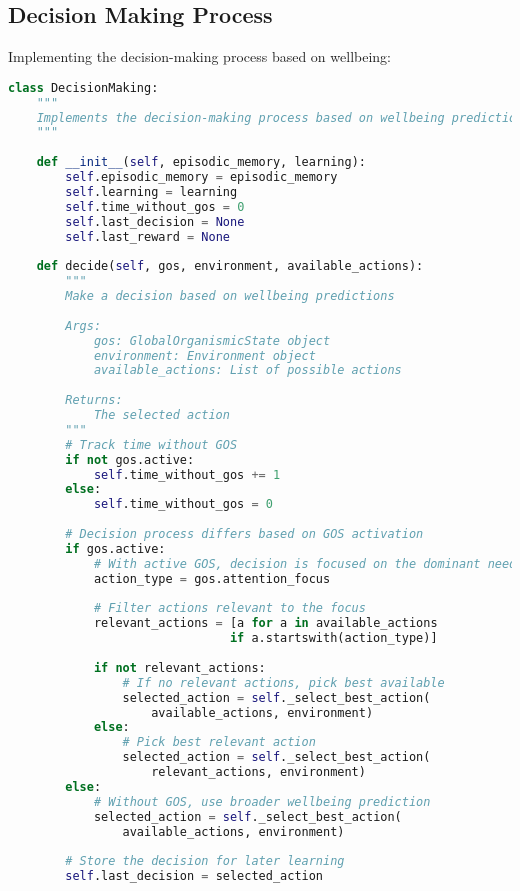 \documentclass[11pt,a4paper]{article}
\begin{document}
\subsection{Decision Making Process}
Implementing the decision-making process based on wellbeing:

\begin{lstlisting}[language=Python]
class DecisionMaking:
    """
    Implements the decision-making process based on wellbeing predictions
    """
    
    def __init__(self, episodic_memory, learning):
        self.episodic_memory = episodic_memory
        self.learning = learning
        self.time_without_gos = 0
        self.last_decision = None
        self.last_reward = None
        
    def decide(self, gos, environment, available_actions):
        """
        Make a decision based on wellbeing predictions
        
        Args:
            gos: GlobalOrganismicState object
            environment: Environment object
            available_actions: List of possible actions
            
        Returns:
            The selected action
        """
        # Track time without GOS
        if not gos.active:
            self.time_without_gos += 1
        else:
            self.time_without_gos = 0
            
        # Decision process differs based on GOS activation
        if gos.active:
            # With active GOS, decision is focused on the dominant need
            action_type = gos.attention_focus
            
            # Filter actions relevant to the focus
            relevant_actions = [a for a in available_actions 
                               if a.startswith(action_type)]
            
            if not relevant_actions:
                # If no relevant actions, pick best available
                selected_action = self._select_best_action(
                    available_actions, environment)
            else:
                # Pick best relevant action
                selected_action = self._select_best_action(
                    relevant_actions, environment)
        else:
            # Without GOS, use broader wellbeing prediction
            selected_action = self._select_best_action(
                available_actions, environment)
            
        # Store the decision for later learning
        self.last_decision = selected_action
        

\end{lstlisting}
\end{document}

